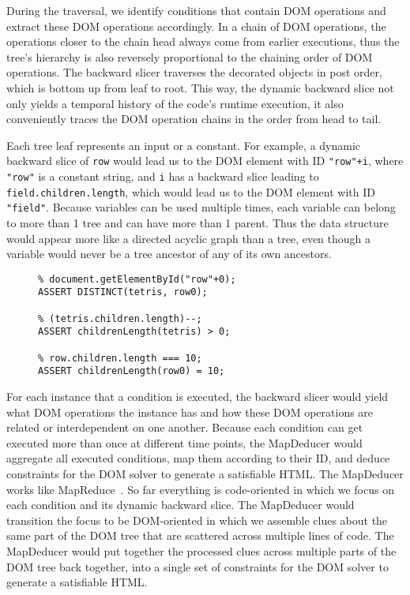 During the traversal, we identify conditions that contain DOM operations and extract these DOM operations accordingly.  
In a chain of DOM operations, the operations closer to the chain head always come from earlier executions, thus the tree's hierarchy is also reversely proportional to the chaining order of DOM operations.  
The backward slicer traverses the decorated objects in post order, which is bottom up from leaf to root.  
This way, the dynamic backward slice not only yields a temporal history of the code's runtime execution, it also conveniently traces the DOM operation chains in the order from head to tail.

Each tree leaf represents an input or a constant.  
For example, a dynamic backward slice of {\tt row} would lead us to the DOM element with ID {\tt "row"+i}, where {\tt "row"} is a constant string, 
and {\tt i} has a backward slice leading to {\tt field.children.length}, which would lead us to the DOM element with ID {\tt "field"}.  
Because variables can be used multiple times, each variable can belong to more than 1 tree and can have more than 1 parent.  
Thus the data structure would appear more like a directed acyclic graph than a tree, even though a variable would never be a tree ancestor of any of its own ancestors.  

\begin{figure}
\begin{lstlisting}[caption=DOM constraints for generating an HTML that would satisfy for going the {\tt True} branch in the {\tt if} statement of Sample Code ~\ref{dom0}.  The constraints are shown in the input format for the CVC~\cite{cvc3} implementation of the SMT solver. {\tt \%} is the comment operator in CVC.,label=constraints0]
% document.getElementById("tetris");
% document.getElementById("row"+0);
ASSERT DISTINCT(tetris, row0);

% (tetris.children.length)--;
ASSERT childrenLength(tetris) > 0;

% row.children.length === 10;
ASSERT childrenLength(row0) = 10;
\end{lstlisting}
\end{figure}

For each instance that a condition is executed, the backward slicer would yield what DOM operations the instance has and how these DOM operations are related or interdependent on one another.  
Because each condition can get executed more than once at different time points, the MapDeducer would aggregate all executed conditions, map them according to their ID, and deduce constraints for the DOM solver to generate a satisfiable HTML.  
The MapDeducer works like MapReduce~\cite{mapreduce}.  So far everything is code-oriented in which we focus on each condition and its dynamic backward slice.  The MapDeducer would transition the focus to be DOM-oriented in which we assemble clues about the same part of the DOM tree that are scattered across multiple lines of code.  
The MapDeducer would put together the processed clues across multiple parts of the DOM tree back together, into a single set of constraints for the DOM solver to generate a satisfiable HTML.

